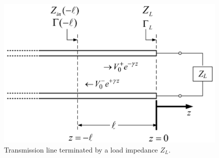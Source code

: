 \begin{figure}[!htp]
    \centering
    \includegraphics[width=0.7\linewidth]{images/Transmission Line Theory/TL_Load2.png}
    \caption{Transmission line terminated by a load impedance $Z_L$.}
    \label{fig:TL_Load}
\end{figure}

